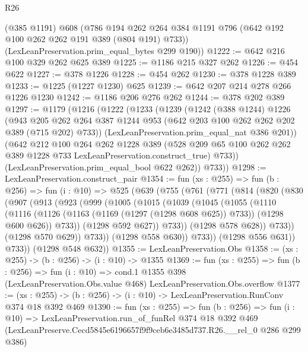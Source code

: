 \begin{lexlean}{R26}
\begin{coremodule}
      (@385 @1191)
      @608
      (@786 @194 @262 @264 @384 @1191 @796 (@642 @192 @100 @262 @262 @191 @389 (@804 @191) @733))
      (LexLeanPreservation.prim_equal_bytes @299 @190))
@1222 := @642 @216 @100 @329 @262 @625 @389
@1225 := @1186 @215 @327 @262
@1226 := @454 @622
@1227 := @378 @1226
@1228 := @454 @262
@1230 := @378 @1228 @389
@1233 := @1225 (@1227 @1230) @625
@1239 := @642 @207 @214 @278 @266 @1226 @1230
@1242 := @1186 @206 @276 @262
@1244 := @378 @202 @389
@1297 := @1179
    (@1216
      (@1222
        (@1233
          (@1239
            (@1242
              (@388 @1244)
              @1226
              (@943
                @205
                @262
                @264
                @387
                @1244
                @953
                (@642 @203 @100 @262 @262 @202 @389 (@715 @202) @733))
              (LexLeanPreservation.prim_equal_nat @386 @201))
            (@642
              @212
              @100
              @264
              @262
              @1228
              @389
              (@528 @209 @65 @100 @262 @262 @389 @1228 @733 LexLeanPreservation.construct_true)
              @733))
          (LexLeanPreservation.prim_equal_bool @622 @262))
        @733))
@1298 := LexLeanPreservation.construct_pair
@1354 := fun (xs : @255) =>
  fun (b : @256) =>
  fun (i : @10) =>
  @525
    (@639
      (@755
        (@761
          (@771
            (@814
              (@820
                (@830
                  (@907
                    (@913
                      (@923
                        (@999
                          (@1005
                            (@1015
                              (@1039
                                (@1045
                                  (@1055
                                    (@1110
                                      (@1116
                                        (@1126
                                          (@1163 (@1169 (@1297 (@1298 @608 @625)) @733))
                                          (@1298 @600 @626))
                                        @733))
                                    (@1298 @592 @627))
                                  @733))
                              (@1298 @578 @628))
                            @733))
                        (@1298 @570 @629))
                      @733))
                  (@1298 @558 @630))
                @733))
            (@1298 @556 @631))
          @733))
      (@1298 @548 @632))
@1355 := LexLeanPreservation.Obs
@1358 := (xs : @255) -> (b : @256) -> (i : @10) -> @1355
@1369 := fun (xs : @255) =>
  fun (b : @256) =>
  fun (i : @10) =>
  cond.{1} @1355 @398 (LexLeanPreservation.Obs.value @468) LexLeanPreservation.Obs.overflow
@1377 := (xs : @255) -> (b : @256) -> (i : @10) -> LexLeanPreservation.RunConv @374 @18 @392 @469
@1390 := fun (xs : @255) =>
  fun (b : @256) =>
  fun (i : @10) =>
  LexLeanPreservation.run_of_funRel
    @374
    @18
    @392
    @469
    (LexLeanPreserve.Cecd5845e6196657f9f9ceb6e3485d737.R26.__rel_0 @286 @299 @386)
\end{coremodule}
\end{lexlean}
